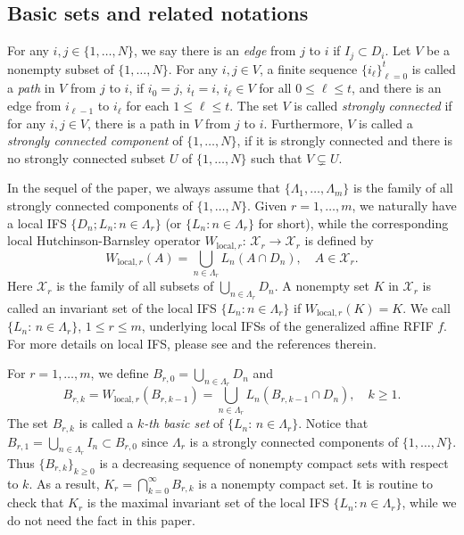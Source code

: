 \documentclass[11pt]{amsart}
\theoremstyle{definition}
\theoremstyle{remark}
\numberwithin{equation}{section}
\begin{document}
\subsection{Basic sets and related notations}

For any $i,j\in \{1,\ldots,N\}$, we say there is an \emph{edge} from $j$ to $i$ if $I_j \subset D_i$.
Let $V$ be a nonempty subset of $\{1,\ldots,N\}$. For any $i,j\in V$, a finite sequence $\{i_{\ell}\}_{\ell=0}^{t}$ is called a \emph{path} in $V$ from $j$ to $i$, if $i_{0}=j$, $i_t=i$, $i_{\ell}\in V$ for all $0\leq \ell\leq t$, and there is an edge from $i_{\ell-1}$ to $i_{\ell}$ for each $1\leq \ell\leq t$. The set $V$ is called \emph{strongly connected} if for any $i,j\in V$, there is a path in $V$ from $j$ to $i$. Furthermore, $V$ is called a \emph{strongly connected component} of $\{1,\ldots,N\}$, if it is strongly connected and there is no strongly connected subset $U$ of $\{1,\ldots,N\}$ such that $V\subsetneq U$.

In the sequel of the paper, we always assume that $\{ \Lambda_1,\ldots,\Lambda_m\}$ is the family of all strongly connected components of $\{1,\ldots,N\}$. Given $r=1,\ldots,m$,
we naturally have a local IFS $\{D_n;L_n: n\in \Lambda_r\}$ (or $\{L_n: n\in \Lambda_r\}$ for short), while the corresponding local Hutchinson-Barnsley operator $W_{\textrm{local},r}:\, \mathcal{X}_r\to \mathcal{X}_r$ is defined by
\[
  W_{\textrm{local},r}(A)=\bigcup_{n\in \Lambda_r} L_n(A\cap D_n), \quad A\in \mathcal{X}_r.
\]
Here $\mathcal{X}_r$ is the family of all subsets of $\bigcup_{n\in \Lambda_r}D_n$. A nonempty set $K$ in $\mathcal{X}_r$ is called an invariant set of the local IFS $\{L_n: n\in \Lambda_r\}$ if $W_{\textrm{local},r}(K)=K$. We call $\{L_n:\, n\in \Lambda_r\}$, $1\leq r\leq m$, underlying local IFSs of the generalized affine RFIF $f$. For more details on local IFS, please see \cite{BarHur93,Kou08} and the references therein. 

For $r=1,\ldots,m$, we define $B_{r,0}=\bigcup_{n\in \Lambda_r} D_n$ and 
\begin{equation}\label{eq:B-rk-RecRelation}
	B_{r,k}=W_{\textrm{local},r}(B_{r,k-1})=\bigcup_{n\in \Lambda_r} L_n(B_{r,k-1}\cap D_n), \quad k \geq 1.
\end{equation}
The set $B_{r,k}$ is called a \emph{$k$-th basic set} of $\{L_n:\, n\in \Lambda_r\}$.
Notice that $B_{r,1}=\bigcup_{n\in \Lambda_r} I_n\subset B_{r,0}$ since $\Lambda_r$ is a strongly connected components of $\{1,\ldots,N\}$. Thus $\{B_{r,k}\}_{k\geq 0}$ is a decreasing sequence of nonempty compact sets with respect to $k$. As a result, $K_r=\bigcap_{k=0}^\infty B_{r,k}$ is a nonempty compact set. It is routine to check that $K_r$ is the maximal invariant set of the local IFS $\{L_n: n\in \Lambda_r\}$, while we do not need the fact in this paper.
\end{document}
